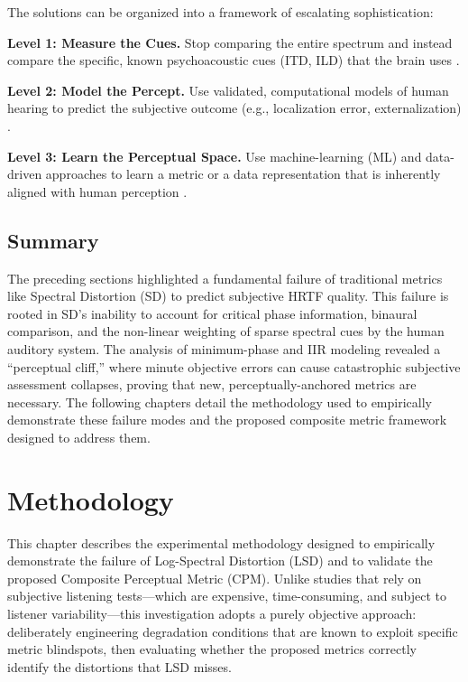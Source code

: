 \documentclass[12pt,a4paper]{article}
\begin{document}
The solutions can be organized into a framework of escalating sophistication:

\textbf{Level 1: Measure the Cues.} Stop comparing the entire spectrum and instead compare the specific, known psychoacoustic cues (ITD, ILD) that the brain uses \cite{wang2021}.

\textbf{Level 2: Model the Percept.} Use validated, computational models of human hearing to predict the subjective outcome (e.g., localization error, externalization) \cite{majdak2022}.

\textbf{Level 3: Learn the Perceptual Space.} Use machine-learning (ML) and data-driven approaches to learn a metric or a data representation that is inherently aligned with human perception \cite{zhang2025}.

\subsection{Summary}

The preceding sections highlighted a fundamental failure of traditional metrics like Spectral Distortion (SD) to predict subjective HRTF quality. This failure is rooted in SD's inability to account for critical phase information, binaural comparison, and the non-linear weighting of sparse spectral cues by the human auditory system. The analysis of minimum-phase and IIR modeling revealed a ``perceptual cliff,'' where minute objective errors can cause catastrophic subjective assessment collapses, proving that new, perceptually-anchored metrics are necessary. The following chapters detail the methodology used to empirically demonstrate these failure modes and the proposed composite metric framework designed to address them.



\newpage
\section{Methodology}

This chapter describes the experimental methodology designed to empirically demonstrate the failure of Log-Spectral Distortion (LSD) and to validate the proposed Composite Perceptual Metric (CPM). Unlike studies that rely on subjective listening tests---which are expensive, time-consuming, and subject to listener variability---this investigation adopts a purely objective approach: deliberately engineering degradation conditions that are known to exploit specific metric blindspots, then evaluating whether the proposed metrics correctly identify the distortions that LSD misses.
\end{document}
